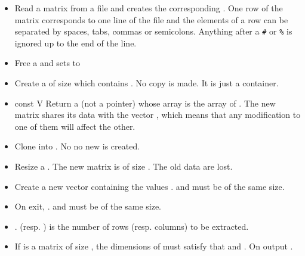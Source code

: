 \begin{itemize}
\item {}
  \sshortdescribe Read a matrix from a file and creates the corresponding
  \PnlMat. One row of the matrix corresponds to one line of the file and the elements of a row can be separated by spaces, tabs, commas or semicolons. Anything after a \verb!#! or \verb!%! is ignored up to the end of the line.

\item {}
  \sshortdescribe Free a \PnlMat and sets  to  
\item {}
    \sshortdescribe Create a \PnlMat of size  
    which contains . No copy is made. It is just a container.
\item {}
  {const \PnlVect \ptr V}
  \sshortdescribe Return a \PnlMat (not a pointer) whose array is
  the array of . The new matrix shares its data with the
  vector , which means that any modification to one of them will affect
  the other.


\item {}
  \sshortdescribe Clone  into . No no new
  \PnlMat is created.

\item {}
  \sshortdescribe Resize a \PnlMat. The new matrix is of size
  . The old data are lost.
\item {}
  \sshortdescribe Create a new vector containing the values .  and  must be of the same size.

\item {}
  \sshortdescribe On exit, .  and
   must be of the same size.

\item {}
  \sshortdescribe {}. 
  (resp. ) is the number of rows (resp. columns) to be extracted.
  
\item {}
    \sshortdescribe If  is a matrix of size ,
    the dimensions of  must satisfy that  and 
    . On output . 
\end{itemize}  


